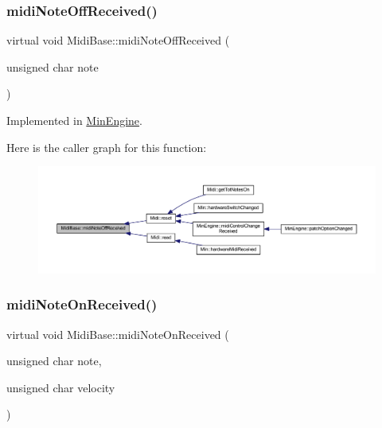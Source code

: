 \subsubsection{\texorpdfstring{midi\+Note\+Off\+Received()}{midiNoteOffReceived()}}
{\footnotesize\ttfamily virtual void Midi\+Base\+::midi\+Note\+Off\+Received (\begin{DoxyParamCaption}\item[{unsigned char}]{note }\end{DoxyParamCaption})\hspace{0.3cm}{\ttfamily [pure virtual]}}



Implemented in \hyperlink{class_min_engine_aaab036105fa3dce51cc8c8345f2edcfe}{Min\+Engine}.

Here is the caller graph for this function\+:
\nopagebreak
\begin{figure}[H]
\begin{center}
\leavevmode
\includegraphics[width=350pt]{class_midi_base_aa26f04b4ead215bce201e480faf7c914_icgraph}
\end{center}
\end{figure}
\mbox{\label{class_midi_base_aa977f9f3db59b0a8b892ee28bcf93695}} 
\subsubsection{\texorpdfstring{midi\+Note\+On\+Received()}{midiNoteOnReceived()}}
{\footnotesize\ttfamily virtual void Midi\+Base\+::midi\+Note\+On\+Received (\begin{DoxyParamCaption}\item[{unsigned char}]{note,  }\item[{unsigned char}]{velocity }\end{DoxyParamCaption})\hspace{0.3cm}{\ttfamily [pure virtual]}}



